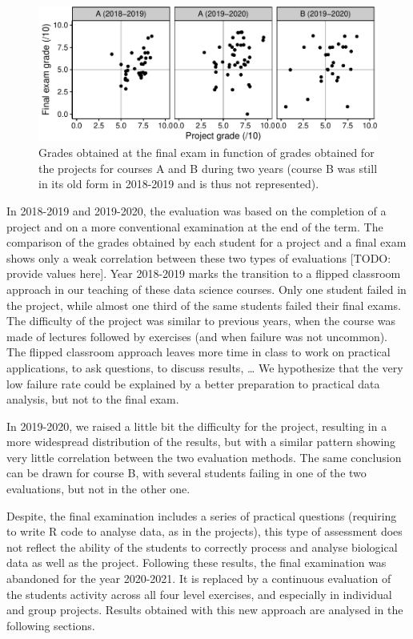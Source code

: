 \documentclass[
]{article}
\begin{document}
\begin{figure}
\centering
\includegraphics{teaching_data_science_files/figure-latex/fig_exams_projects-1.pdf}
\caption{Grades obtained at the final exam in function of grades
obtained for the projects for courses A and B during two years (course B
was still in its old form in 2018-2019 and is thus not represented).}
\end{figure}

In 2018-2019 and 2019-2020, the evaluation was based on the completion
of a project and on a more conventional examination at the end of the
term. The comparison of the grades obtained by each student for a
project and a final exam shows only a weak correlation between these two
types of evaluations {[}TODO: provide values here{]}. Year 2018-2019
marks the transition to a flipped classroom approach in our teaching of
these data science courses. Only one student failed in the project,
while almost one third of the same students failed their final exams.
The difficulty of the project was similar to previous years, when the
course was made of lectures followed by exercises (and when failure was
not uncommon). The flipped classroom approach leaves more time in class
to work on practical applications, to ask questions, to discuss results,
\ldots{} We hypothesize that the very low failure rate could be
explained by a better preparation to practical data analysis, but not to
the final exam.

In 2019-2020, we raised a little bit the difficulty for the project,
resulting in a more widespread distribution of the results, but with a
similar pattern showing very little correlation between the two
evaluation methods. The same conclusion can be drawn for course B, with
several students failing in one of the two evaluations, but not in the
other one.

Despite, the final examination includes a series of practical questions
(requiring to write R code to analyse data, as in the projects), this
type of assessment does not reflect the ability of the students to
correctly process and analyse biological data as well as the project.
Following these results, the final examination was abandoned for the
year 2020-2021. It is replaced by a continuous evaluation of the
students activity across all four level exercises, and especially in
individual and group projects. Results obtained with this new approach
are analysed in the following sections.
\end{document}
